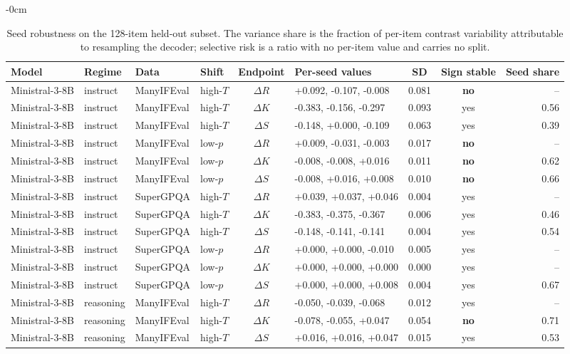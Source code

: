 \begin{table}[H]
\begin{adjustwidth}{-\extralength}{0cm}
\footnotesize
\caption{Seed robustness on the 128-item held-out subset. The variance share is the fraction of per-item contrast variability attributable to resampling the decoder; selective risk is a ratio with no per-item value and carries no split.\label{tab:seeds}}
\begin{tabular}{llllclccr}
\toprule
\textbf{Model} & \textbf{Regime} & \textbf{Data} & \textbf{Shift} & \textbf{Endpoint} & \textbf{Per-seed values} & \textbf{SD} & \textbf{Sign stable} & \textbf{Seed share} \\
\midrule
Ministral-3-8B & instruct & ManyIFEval & high-$T$ & $\Delta R$ & +0.092, -0.107, -0.008 & 0.081 & \textbf{no} & -- \tabularnewline
Ministral-3-8B & instruct & ManyIFEval & high-$T$ & $\Delta K$ & -0.383, -0.156, -0.297 & 0.093 & yes & 0.56 \tabularnewline
Ministral-3-8B & instruct & ManyIFEval & high-$T$ & $\Delta S$ & -0.148, +0.000, -0.109 & 0.063 & yes & 0.39 \tabularnewline
Ministral-3-8B & instruct & ManyIFEval & low-$p$ & $\Delta R$ & +0.009, -0.031, -0.003 & 0.017 & \textbf{no} & -- \tabularnewline
Ministral-3-8B & instruct & ManyIFEval & low-$p$ & $\Delta K$ & -0.008, -0.008, +0.016 & 0.011 & \textbf{no} & 0.62 \tabularnewline
Ministral-3-8B & instruct & ManyIFEval & low-$p$ & $\Delta S$ & -0.008, +0.016, +0.008 & 0.010 & \textbf{no} & 0.66 \tabularnewline
Ministral-3-8B & instruct & SuperGPQA & high-$T$ & $\Delta R$ & +0.039, +0.037, +0.046 & 0.004 & yes & -- \tabularnewline
Ministral-3-8B & instruct & SuperGPQA & high-$T$ & $\Delta K$ & -0.383, -0.375, -0.367 & 0.006 & yes & 0.46 \tabularnewline
Ministral-3-8B & instruct & SuperGPQA & high-$T$ & $\Delta S$ & -0.148, -0.141, -0.141 & 0.004 & yes & 0.54 \tabularnewline
Ministral-3-8B & instruct & SuperGPQA & low-$p$ & $\Delta R$ & +0.000, +0.000, -0.010 & 0.005 & yes & -- \tabularnewline
Ministral-3-8B & instruct & SuperGPQA & low-$p$ & $\Delta K$ & +0.000, +0.000, +0.000 & 0.000 & yes & -- \tabularnewline
Ministral-3-8B & instruct & SuperGPQA & low-$p$ & $\Delta S$ & +0.000, +0.000, +0.008 & 0.004 & yes & 0.67 \tabularnewline
Ministral-3-8B & reasoning & ManyIFEval & high-$T$ & $\Delta R$ & -0.050, -0.039, -0.068 & 0.012 & yes & -- \tabularnewline
Ministral-3-8B & reasoning & ManyIFEval & high-$T$ & $\Delta K$ & -0.078, -0.055, +0.047 & 0.054 & \textbf{no} & 0.71 \tabularnewline
Ministral-3-8B & reasoning & ManyIFEval & high-$T$ & $\Delta S$ & +0.016, +0.016, +0.047 & 0.015 & yes & 0.53 \tabularnewline

\end{tabular}
\end{adjustwidth}
\end{table}
